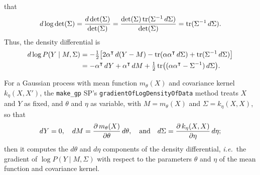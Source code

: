 \documentclass{article}
\newcommand{\Mu}{M}
\newcommand{\T}{\intercal}
\newcommand{\code}[1]{\texttt{#1}}
\newcommand{\given}{\mathrel{|}}
\newcommand{\smallfrac}[2]{{\textstyle\frac{#1}{#2}}}
\newcommand{\n}[1]{\text{\rm #1}}
\newcommand{\zero}{\n0}
\newcommand{\one}{\n1}
\newcommand{\two}{\n2}
\DeclareMathOperator{\tr}{tr}
\begin{document}
 that
%
\begin{equation}
  d \log \det(\Sigma)
    = \frac{d \det(\Sigma)}{\det(\Sigma)}
    = \frac{\det(\Sigma) \tr(\Sigma^{-\one}\,d\Sigma)}{\det(\Sigma)}
    = \tr(\Sigma^{-\one}\,d\Sigma).
\end{equation}
%
Thus, the density differential is
%
\begin{align}
  d \log P(Y \given \Mu, \Sigma)
   &= -\smallfrac{\one}{\two}
      \bigl[
        \two \alpha^\T\,d(Y - \Mu)
        - \tr(\alpha \alpha^\T\,d\Sigma)
        + \tr(\Sigma^{-\one}\,d\Sigma)
      \bigr] \\
   &= -\alpha^\T\,dY
      + \alpha^\T\,d\Mu
      + \smallfrac{\one}{\two}
        \tr\bigl((\alpha \alpha^\T - \Sigma^{-\one}) \,d\Sigma\bigr).
\end{align}

For a Gaussian process with mean function $m_\theta(X)$ and covariance
 kernel $k_\eta(X, X')$, the \code{make\_gp} SP's
 \code{gradientOfLogDensityOfData} method treats $X$ and $Y$ as fixed,
 and $\theta$ and $\eta$ as variable, with $\Mu = m_\theta(X)$ and
 $\Sigma = k_\eta(X, X)$, so that
%
\begin{equation}
  dY = \zero,
  \quad
  d\Mu = \frac{\partial\,m_\theta(X)}{\partial\theta}\,d\theta,
  \quad\text{and}\quad
  d\Sigma = \frac{\partial\,k_\eta(X, X)}{\partial\eta}\,d\eta;
\end{equation}
%
 then it computes the $d\theta$ and $d\eta$ components of the
 density differential, \textit{i.e.}~the gradient of $\log P(Y \given
 \Mu, \Sigma)$ with respect to the parameters $\theta$ and $\eta$ of
 the mean function and covariance kernel.
\end{document}
